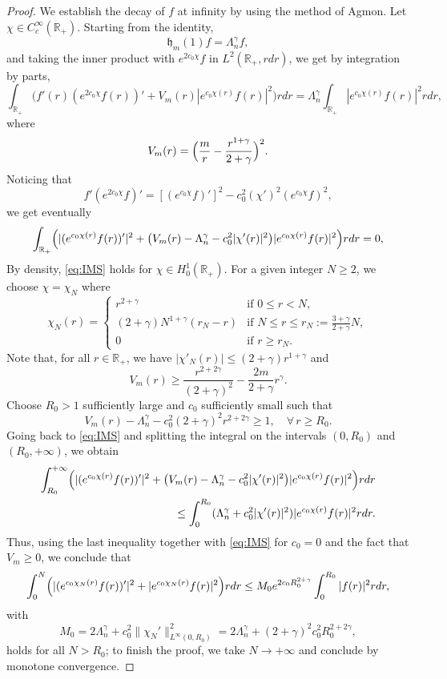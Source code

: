 \documentclass[11pt]{amsart}
\theoremstyle{remark}
\newcommand{\R}{\mathbb{R}}
\numberwithin{equation}{section}
\begin{document}
\begin{proof}
    We establish the decay of $f$ at infinity by using the method of Agmon. Let $\chi\in C_c^\infty(\R_+)$. Starting from the identity,
    \[\mathfrak h_m(1)f=\Lambda_n^\gamma f,\]
    and taking the inner product with $e^{2c_0\chi}f$ in $L^2(\R_+,rdr)$, we get by integration by parts,
    \[\int_{\R_+}\bigl(f'(r)(e^{2c_0\chi}f(r))'+V_m (r)|e^{c_0\chi(r)}f(r)|^2\bigr)rdr=\Lambda_n^\gamma\int_{\R_+}|e^{c_0\chi(r)}f(r)|^2rdr,\]
    where
    \[V_m(r)=\Bigl(\frac{m}{r}-\frac{r^{1+\gamma}}{2+\gamma} \Bigr)^2.\]
    Noticing that
    \[f'(e^{2c_0\chi}f)'=[(e^{c_0\chi}f)']^2-c_0^2(\chi')^2(e^{c_0\chi}f)^2,\]
    we get eventually
    \begin{equation}\label{eq:IMS}
    \int_{\R_+}\Bigl(|(e^{c_0\chi(r)}f(r))'|^2+\bigl(V_m(r)-\Lambda_n^\gamma-c_0^2|\chi'(r)|^2\bigr)|e^{c_0\chi(r)}f(r)|^2\Bigr)rdr=0, 
    \end{equation}
By density, \eqref{eq:IMS} holds for $\chi\in H^1_0(\R_+)$. For a given integer $N\geq 2$, we choose $\chi=\chi_N$ where
\[\chi_N(r)=\begin{cases}
    r^{2+\gamma}&\mbox{if }0\leq r<N,\\
    (2+\gamma)N^{1+\gamma}(r_N-r)&\mbox{if }N\leq r\leq r_N:=\frac{3+\gamma}{2+\gamma}N,\\
    0&\mbox{if }r\geq r_N.
\end{cases}\]
Note that, for all $r\in\R_+$, we have $|\chi'_N(r)|\leq (2+\gamma)r^{1+\gamma}$ and 
\[V_m(r)\geq \frac{r^{2+2\gamma}}{(2+\gamma)^2}-\frac{2m}{2+\gamma}r^\gamma.\]
Choose $R_0> 1$ sufficiently large and $c_0$ sufficiently small such that
\[V_m(r)-\Lambda_n^\gamma-c_0^2(2+\gamma)^2r^{2+2\gamma}\geq 1,\quad\forall\,r\geq R_0.\]
Going back to \eqref{eq:IMS} and splitting the integral on the intervals $(0,R_0)$ and $(R_0,+\infty)$, we obtain
\[\begin{split}\int_{R_0}^{+\infty}\Bigl(|(e^{c_0\chi(r)}f(r))'|^2+\bigl(V_m(r)-\Lambda_n^\gamma-c_0^2|\chi'(r)|^2\bigr)|e^{c_0\chi(r)}f(r)|^2\Bigr)rdr
\\
\leq \int_{0}^{R_0}(\Lambda_n^\gamma+c_0^2|\chi'(r)|^2)|e^{c_0\chi(r)}f(r)|^2rdr.\end{split}\]
Thus, using the last inequality together with \eqref{eq:IMS} for $c_0=0$ and the fact that $V_m\ge 0$, we conclude that
 \[\int_{0}^N\Bigl(|(e^{c_0\chi_N(r)}f(r))'|^2+|e^{c_0\chi_N(r)}f(r)|^2\Bigr)rdr\leq M_0 e^{2c_0R_0^{2+\gamma}}\int_{0}^{R_0}|f(r)|^2rdr,\]
 with
 \[M_0=2\Lambda_n^\gamma+c_0^2\|\chi_N'\|_{L^\infty(0,R_0)}^2=2\Lambda_n^\gamma+(2+\gamma)^2c_0^2R_0^{2+2\gamma},\]
holds for all $N>R_0$; to finish the proof, we take $N\to+\infty$ and conclude by monotone convergence.
\end{proof}
\end{document}
